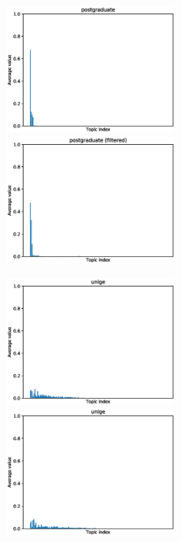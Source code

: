 \begin{figure}[ht]
    \centering
    \includegraphics[width=0.5\textwidth]{images/similarity_graphs/non-filtered/postgraduate.eps}%
    \hfill
    \includegraphics[width=0.5\textwidth]{images/similarity_graphs/filtered/postgraduate.eps}
\end{figure}

\pagebreak

\begin{figure}[ht]
    \centering
    \includegraphics[width=0.5\textwidth]{images/similarity_graphs/non-filtered/unige.eps}%
    \hfill
    \includegraphics[width=0.5\textwidth]{images/similarity_graphs/filtered/unige.eps}
\end{figure}